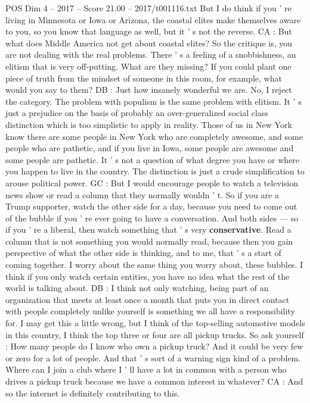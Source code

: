 \begin{textsample}{POS Dim 4 – 2017 – Score 21.00 – 2017/t001116.txt}
But I do think if you ' re living in Minnesota or Iowa or Arizona, the coastal elites make themselves aware to you, so you know that language as well, but it ' s not the reverse.
CA : But what does Middle America not get about coastal elites?
So the critique is, you are not dealing with the real problems.
There ' s a feeling of a snobbishness, an elitism that is very off-putting.
What are they missing?
If you could plant one piece of truth from the mindset of someone in this room, for example, what would you say to them?
DB : Just how insanely wonderful we are.
No, I reject the category.
The problem with populism is the same problem with elitism.
It ' s just a prejudice on the basis of probably an over-generalized social class distinction which is too simplistic to apply in reality.
Those of us in New York know there are some people in New York who are completely awesome, and some people who are pathetic, and if you live in Iowa, some people are awesome and some people are pathetic.
It ' s not a question of what degree you have or where you happen to live in the country.
The distinction is just a crude simplification to arouse political power.
GC : But I would encourage people to watch a television news show or read a column that they normally wouldn ' t.
So if you are a Trump supporter, watch the other side for a day, because you need to come out of the bubble if you ' re ever going to have a conversation.
And both sides — so if you ' re a liberal, then watch something that ' s very \textbf{conservative}.
Read a column that is not something you would normally read, because then you gain perspective of what the other side is thinking, and to me, that ' s a start of coming together.
I worry about the same thing you worry about, these bubbles.
I think if you only watch certain entities, you have no idea what the rest of the world is talking about.
DB : I think not only watching, being part of an organization that meets at least once a month that puts you in direct contact with people completely unlike yourself is something we all have a responsibility for.
I may get this a little wrong, but I think of the top-selling automotive models in this country, I think the top three or four are all pickup trucks.
So ask yourself : How many people do I know who own a pickup truck?
And it could be very few or zero for a lot of people.
And that ' s sort of a warning sign kind of a problem.
Where can I join a club where I ' ll have a lot in common with a person who drives a pickup truck because we have a common interest in whatever?
CA : And so the internet is definitely contributing to this.

\end{textsample}
